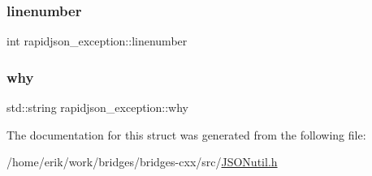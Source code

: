 \mbox{\label{structrapidjson__exception_a9c0263f853d8a17911e29cae66708e67}} 
\subsubsection{\texorpdfstring{linenumber}{linenumber}}
{\footnotesize\ttfamily int rapidjson\+\_\+exception\+::linenumber}

\mbox{\label{structrapidjson__exception_a6b432b89bd7052332bc923f274249e1e}} 
\subsubsection{\texorpdfstring{why}{why}}
{\footnotesize\ttfamily std\+::string rapidjson\+\_\+exception\+::why}



The documentation for this struct was generated from the following file\+:\begin{DoxyCompactItemize}
\item 
/home/erik/work/bridges/bridges-\/cxx/src/\hyperlink{_j_s_o_nutil_8h}{J\+S\+O\+Nutil.\+h}\end{DoxyCompactItemize}
